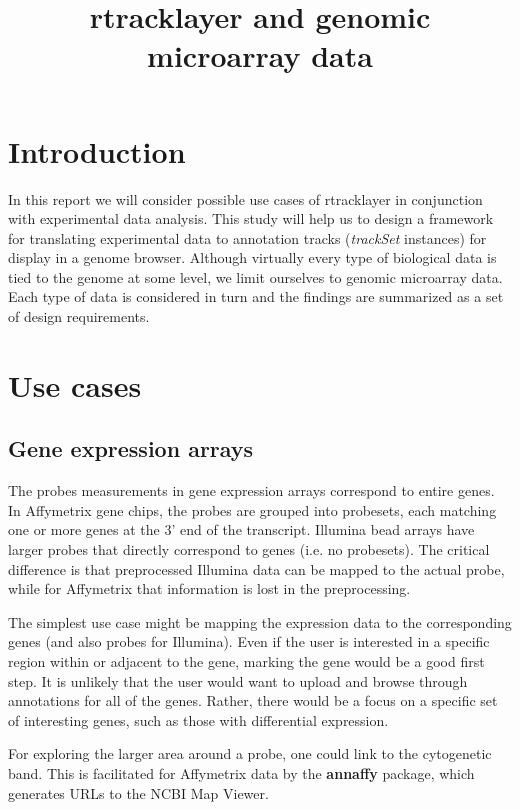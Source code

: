 \documentclass{article}
\title{\textbf{rtracklayer} and genomic microarray data}
\begin{document}
\maketitle

\section{Introduction}
\label{sec:intro}

In this report we will consider possible use cases of rtracklayer in conjunction with experimental data analysis. This study will help us to design a framework for translating experimental data to annotation tracks (\textit{trackSet} instances) for display in a genome browser. Although virtually every type of biological data is tied to the genome at some level, we limit ourselves to genomic microarray data.  Each type of data is considered in turn and the findings are summarized as a set of design requirements.

\section{Use cases}
\label{sec:cases}

\subsection{Gene expression arrays}
\label{sec:expression}

The probes measurements in gene expression arrays correspond to entire genes. In Affymetrix gene chips, the probes are grouped into probesets, each matching one or more genes at the 3' end of the transcript. Illumina bead arrays have larger probes that directly correspond to genes (i.e. no probesets). The critical difference is that preprocessed Illumina data can be mapped to the actual probe, while for Affymetrix that information is lost in the preprocessing.

The simplest use case might be mapping the expression data to the corresponding genes (and also probes for Illumina). Even if the user is interested in a specific region within or adjacent to the gene, marking the gene would be a good first step. It is unlikely that the user would want to upload and browse through annotations for all of the genes. Rather, there would be a focus on a specific set of interesting genes, such as those with differential expression.

For exploring the larger area around a probe, one could link to the cytogenetic band. This is facilitated for Affymetrix data by the \textbf{annaffy} package, which generates URLs to the NCBI Map Viewer.
\end{document}
